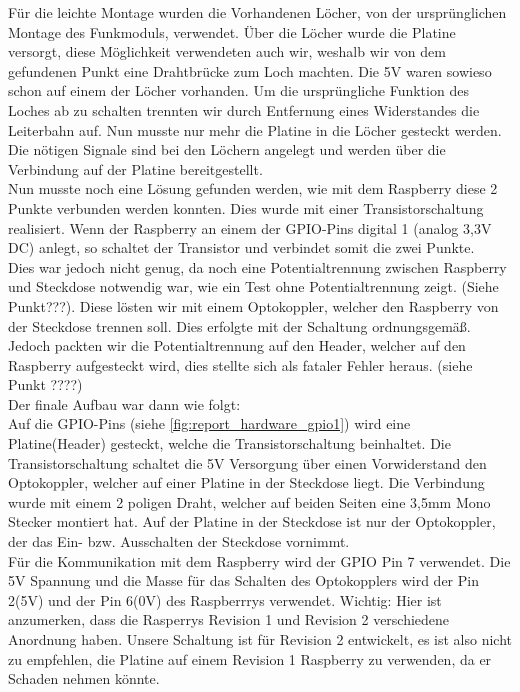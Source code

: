 Für die leichte Montage wurden die Vorhandenen Löcher, von der ursprünglichen Montage des Funkmoduls, verwendet. Über die Löcher wurde die Platine versorgt, diese Möglichkeit verwendeten auch wir, weshalb wir von dem gefundenen Punkt eine Drahtbrücke zum Loch machten. Die 5V waren sowieso schon auf einem der Löcher vorhanden. Um die ursprüngliche Funktion des Loches ab zu schalten trennten wir durch Entfernung eines Widerstandes die Leiterbahn auf. Nun musste nur mehr die Platine in die Löcher gesteckt werden. Die nötigen Signale sind bei den Löchern angelegt und werden über die Verbindung auf der Platine bereitgestellt.\\
Nun musste noch eine Lösung gefunden werden, wie mit dem Raspberry diese 2 Punkte verbunden werden konnten. Dies wurde mit einer Transistorschaltung realisiert. Wenn der Raspberry an einem der GPIO-Pins digital 1 (analog 3,3V DC) anlegt, so schaltet der Transistor und verbindet somit die zwei Punkte. \\
Dies war jedoch nicht genug, da noch eine Potentialtrennung zwischen Raspberry und Steckdose  notwendig war, wie ein Test ohne Potentialtrennung zeigt. (Siehe Punkt???). Diese lösten wir mit einem Optokoppler, welcher den Raspberry von der Steckdose trennen soll. Dies erfolgte mit der Schaltung ordnungsgemäß. Jedoch packten wir die Potentialtrennung auf den Header, welcher auf den Raspberry aufgesteckt wird, dies stellte sich als fataler Fehler heraus. (siehe Punkt ????)\\
Der finale Aufbau war dann wie folgt:\\
Auf die GPIO-Pins (siehe \autoref{fig:report_hardware_gpio1}) wird eine Platine(Header) gesteckt, welche die Transistorschaltung beinhaltet. Die Transistorschaltung schaltet die 5V Versorgung über einen Vorwiderstand den Optokoppler, welcher auf einer Platine in der Steckdose liegt. Die Verbindung wurde mit einem 2 poligen Draht, welcher auf beiden Seiten eine 3,5mm Mono Stecker montiert hat. Auf der Platine in der Steckdose ist nur der Optokoppler, der das Ein- bzw. Ausschalten der Steckdose vornimmt.\\
Für die Kommunikation mit dem Raspberry wird der GPIO Pin 7 verwendet. Die 5V Spannung und die Masse für das Schalten des Optokopplers wird der Pin 2(5V) und der Pin 6(0V) des Raspberrrys verwendet. Wichtig: Hier ist anzumerken, dass die Rasperrys Revision 1 und Revision 2 verschiedene Anordnung haben. Unsere Schaltung ist für Revision 2 entwickelt, es ist also nicht zu empfehlen, die Platine auf einem Revision 1 Raspberry zu verwenden, da er Schaden nehmen könnte.
